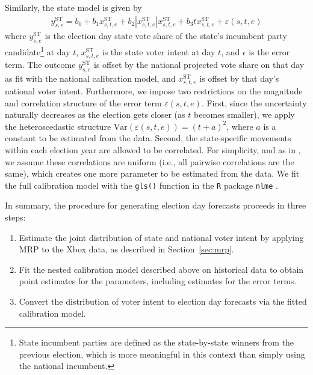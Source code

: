 \documentclass[preprint,authoryear,12pt]{elsarticle}
\begin{document}
Similarly, the state model
is given by
\begin{align*}
  y_{s,e}^{\text{ST}}=b_0+b_1 x_{s,t,e}^{\text{ST}}+
  b_2|x_{s,t,e}^{\text{ST}}|x_{s,t,e}^{\text{ST}} +
  b_3tx_{s,t,e}^{\text{ST}} + \varepsilon(s,t,e)
\end{align*}
where $y_{s,e}^{\text{ST}}$ is the election day state vote share of the state's
incumbent party candidate\footnote{State incumbent parties are defined as the
  state-by-state winners from the previous election, which is more meaningful in this context than simply using the national incumbent.} at day $t$,
$x_{s,t,e}^{\text{ST}}$ is the state voter intent at day $t$, and $\epsilon$ is
the error term. The outcome $y_{s,e}^{\text{ST}}$ is offset by the national
projected vote share on that day as fit with the national calibration model,
and $x_{s,t,e}^{\text{ST}}$ is offset by that day's national voter intent.
Furthermore, we impose two restrictions on the magnitude and correlation
structure of the error term $\varepsilon(s,t,e)$. First, since the uncertainty
naturally decreases as the election gets closer (as $t$ becomes smaller), we
apply the heteroscedastic structure $\text{Var}(\varepsilon(s,t,e))=(t+a)^2$,
where $a$ is a constant to be estimated from the data. Second, the
state-specific movements within each election year are allowed to be
correlated. For simplicity, and as in \citet{chen2008modeling}, we assume these correlations are uniform (i.e., all
pairwise correlations are the same), which creates one more parameter to be
estimated from the data. We fit the full calibration model with the \texttt{gls()}
function in the \texttt{R} package \texttt{nlme} \citep{nlme}.

In summary, the procedure for generating election day forecasts proceeds in three steps:

\begin{enumerate}
\item Estimate the joint distribution of state and national voter intent by applying MRP to the Xbox data,
as described in Section~\ref{sec:mrp}.
\item Fit the nested calibration model described above on historical data to obtain point estimates for the parameters, including
estimates for the error terms.
\item Convert the distribution of voter intent to election day forecasts via the fitted calibration model.
\end{enumerate}
\end{document}
